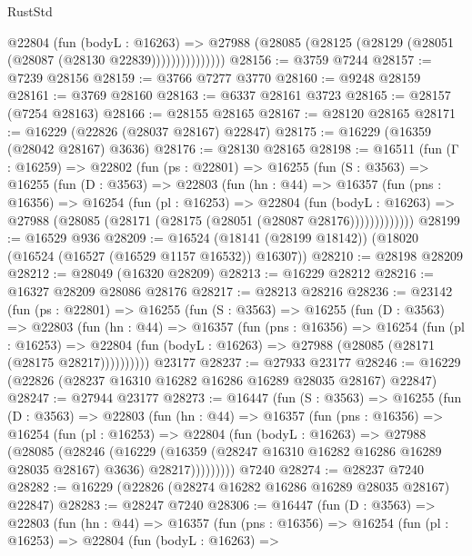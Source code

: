 \begin{lexlean}{RustStd}
\begin{coremodule}
                  @22804
                    (fun (bodyL : @16263) =>
                    @27988 (@28085 (@28125 (@28129 (@28051 (@28087 (@28130 @22839)))))))))))))))
@28156 := @3759 @7244
@28157 := @7239 @28156
@28159 := @3766 @7277 @3770
@28160 := @9248 @28159
@28161 := @3769 @28160
@28163 := @6337 @28161 @3723
@28165 := @28157 (@7254 @28163)
@28166 := @28155 @28165
@28167 := @28120 @28165
@28171 := @16229 (@22826 (@28037 @28167) @22847)
@28175 := @16229 (@16359 (@28042 @28167) @3636)
@28176 := @28130 @28165
@28198 := @16511
    (fun (Γ : @16259) =>
    @22802
      (fun (ps : @22801) =>
      @16255
        (fun (S : @3563) =>
        @16255
          (fun (D : @3563) =>
          @22803
            (fun (hn : @44) =>
            @16357
              (fun (pns : @16356) =>
              @16254
                (fun (pl : @16253) =>
                @22804
                  (fun (bodyL : @16263) =>
                  @27988 (@28085 (@28171 (@28175 (@28051 (@28087 @28176)))))))))))))
@28199 := @16529 @936
@28209 := @16524 (@18141 (@28199 @18142)) (@18020 (@16524 (@16527 (@16529 @1157 @16532)) @16307))
@28210 := @28198 @28209
@28212 := @28049 (@16320 @28209)
@28213 := @16229 @28212
@28216 := @16327 @28209 @28086 @28176
@28217 := @28213 @28216
@28236 := @23142
    (fun (ps : @22801) =>
    @16255
      (fun (S : @3563) =>
      @16255
        (fun (D : @3563) =>
        @22803
          (fun (hn : @44) =>
          @16357
            (fun (pns : @16356) =>
            @16254
              (fun (pl : @16253) =>
              @22804 (fun (bodyL : @16263) => @27988 (@28085 (@28171 (@28175 @28217))))))))))
    @23177
@28237 := @27933 @23177
@28246 := @16229 (@22826 (@28237 @16310 @16282 @16286 @16289 @28035 @28167) @22847)
@28247 := @27944 @23177
@28273 := @16447
    (fun (S : @3563) =>
    @16255
      (fun (D : @3563) =>
      @22803
        (fun (hn : @44) =>
        @16357
          (fun (pns : @16356) =>
          @16254
            (fun (pl : @16253) =>
            @22804
              (fun (bodyL : @16263) =>
              @27988
                (@28085
                  (@28246
                    (@16229
                      (@16359 (@28247 @16310 @16282 @16286 @16289 @28035 @28167) @3636)
                      @28217)))))))))
    @7240
@28274 := @28237 @7240
@28282 := @16229 (@22826 (@28274 @16282 @16286 @16289 @28035 @28167) @22847)
@28283 := @28247 @7240
@28306 := @16447
    (fun (D : @3563) =>
    @22803
      (fun (hn : @44) =>
      @16357
        (fun (pns : @16356) =>
        @16254
          (fun (pl : @16253) =>
          @22804
            (fun (bodyL : @16263) =>

\end{coremodule}
\end{lexlean}
